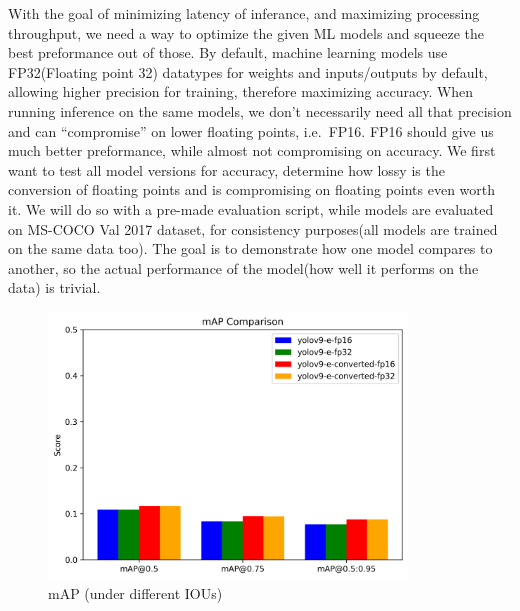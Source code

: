 \documentclass[
]{article}
\begin{document}
With the goal of minimizing latency of inferance, and maximizing
processing throughput, we need a way to optimize the given ML models and
squeeze the best preformance out of those. \newline By default, machine
learning models use FP32(Floating point 32) datatypes for weights and
inputs/outputs by default, allowing higher precision for training,
therefore maximizing accuracy. When running inference on the same
models, we don't necessarily need all that precision and can
``compromise'' on lower floating points, i.e.~FP16. FP16 should give us
much better preformance, while almost not compromising on accuracy.
\newline We first want to test all model versions for accuracy,
determine how lossy is the conversion of floating points and is
compromising on floating points even worth it. \newline We will do so
with a pre-made evaluation script, while models are evaluated on MS-COCO
Val 2017 dataset, for consistency purposes(all models are trained on the
same data too). \newline The goal is to demonstrate how one model
compares to another, so the actual performance of the model(how well it
performs on the data) is trivial.

\begin{figure}[H]

{\centering \includegraphics[width=3.75in,height=\textheight,keepaspectratio]{../images/map_comparison.png}

}

\caption{mAP (under different IOUs)}

\end{figure}%
\end{document}
